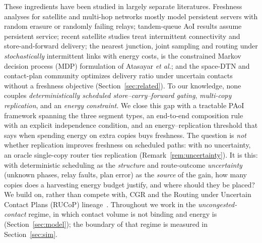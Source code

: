 \documentclass[twocolumn,3p,times,procedia]{elsarticle}
\theoremstyle{plain}
\theoremstyle{remark}
\begin{document}
These ingredients have been studied in largely separate literatures.
Freshness analyses for satellite and multi-hop networks mostly model
persistent servers with random erasure or randomly failing relays;
tandem-queue AoI results assume persistent service; recent satellite
studies treat intermittent connectivity and store-and-forward delivery;
the nearest junction, joint sampling and routing under
\emph{stochastically} intermittent links with energy costs, is the
constrained Markov decision process (MDP) formulation of Atasayar
\emph{et al.}; and the space-DTN and contact-plan community optimizes
delivery ratio under uncertain contacts without a freshness objective
(Section~\ref{sec:related}). To our knowledge, none couples
\emph{deterministically scheduled store--carry--forward gating},
\emph{multi-copy replication}, and an \emph{energy constraint}. We close
this gap with a tractable PAoI framework spanning the three segment
types, an end-to-end composition rule with an explicit independence
condition, and an energy--replication threshold that says when spending
energy on extra copies buys freshness. The question is \emph{not}
whether replication improves freshness on scheduled paths: with no
uncertainty, an oracle single-copy router ties replication
(Remark~\ref{rem:uncertainty}). It is this: with deterministic
scheduling as the \emph{structure} and route-outcome \emph{uncertainty}
(unknown phases, relay faults, plan error) as the \emph{source} of the
gain, how many copies does a harvesting energy budget justify, and
where should they be placed? We build on, rather than compete with,
CGR and the Routing under Uncertain Contact Plans (RUCoP)
lineage~\cite{rucop}. Throughout we work in the
\emph{uncongested-contact} regime, in which contact volume is not
binding and energy is (Section~\ref{sec:model}); the boundary of that
regime is measured in Section~\ref{sec:sim}.
\end{document}
